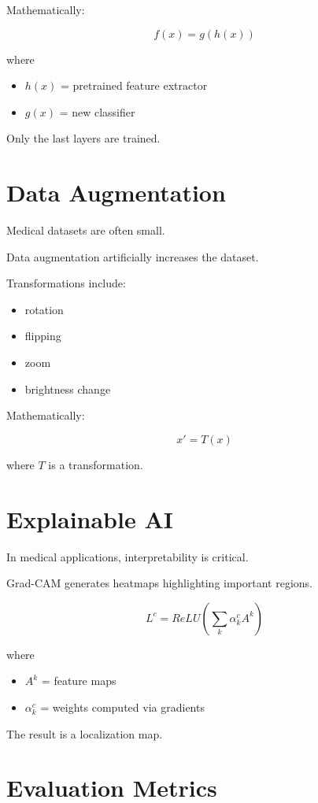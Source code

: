 \documentclass[11pt]{article}
\begin{document}
Mathematically:

\[
f(x) = g(h(x))
\]

where

\begin{itemize}
\item $h(x)$ = pretrained feature extractor
\item $g(x)$ = new classifier
\end{itemize}

Only the last layers are trained.

\section{Data Augmentation}

Medical datasets are often small.

Data augmentation artificially increases the dataset.

Transformations include:

\begin{itemize}
\item rotation
\item flipping
\item zoom
\item brightness change
\end{itemize}

Mathematically:

\[
x' = T(x)
\]

where $T$ is a transformation.

\section{Explainable AI}

In medical applications, interpretability is critical.

Grad-CAM generates heatmaps highlighting important regions.

\[
L^c = ReLU\left(
\sum_k \alpha_k^c A^k
\right)
\]

where

\begin{itemize}
\item $A^k$ = feature maps
\item $\alpha_k^c$ = weights computed via gradients
\end{itemize}

The result is a localization map.

\section{Evaluation Metrics}
\end{document}
